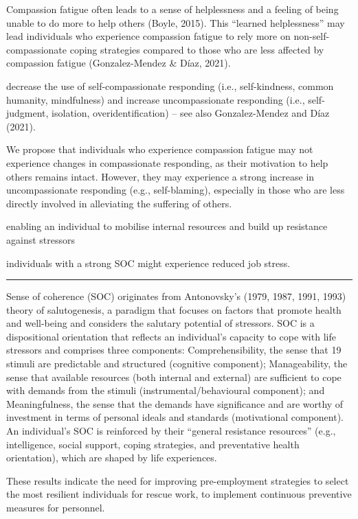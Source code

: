 \documentclass[
  man,floatsintext]{apa7}
\begin{document}
Compassion fatigue often leads to a sense of helplessness and a feeling of being unable to do more to help others (Boyle, 2015). This ``learned helplessness'' may lead individuals who experience compassion fatigue to rely more on non-self-compassionate coping strategies compared to those who are less affected by compassion fatigue (Gonzalez-Mendez \& Díaz, 2021).

decrease the use of self-compassionate responding (i.e., self-kindness, common humanity, mindfulness) and increase uncompassionate responding (i.e., self-judgment, isolation, overidentification) -- see also Gonzalez-Mendez and Díaz (2021).

We propose that individuals who experience compassion fatigue may not experience changes in compassionate responding, as their motivation to help others remains intact. However, they may experience a strong increase in uncompassionate responding (e.g., self-blaming), especially in those who are less directly involved in alleviating the suffering of others.

enabling an individual to mobilise internal resources and build up resistance against stressors

individuals with a strong SOC might experience reduced job stress.

\begin{center}\rule{0.5\linewidth}{0.5pt}\end{center}

Sense of coherence (SOC) originates from Antonovsky's (1979,
1987, 1991, 1993) theory of salutogenesis, a paradigm that focuses
on factors that promote health and well-being and considers the
salutary potential of stressors. SOC is a dispositional orientation that
reflects an individual's capacity to cope with life stressors and
comprises three components: Comprehensibility, the sense that
19
stimuli are predictable and structured (cognitive component);
Manageability, the sense that available resources (both internal and
external) are sufficient to cope with demands from the stimuli
(instrumental/behavioural component); and Meaningfulness, the
sense that the demands have significance and are worthy of
investment in terms of personal ideals and standards (motivational
component). An individual's SOC is reinforced by their ``general
resistance resources'' (e.g., intelligence, social support, coping
strategies, and preventative health orientation), which are shaped by
life experiences.

These results indicate the need for improving pre-employment strategies to select the most resilient individuals for rescue work, to implement continuous preventive measures for personnel.
\end{document}

